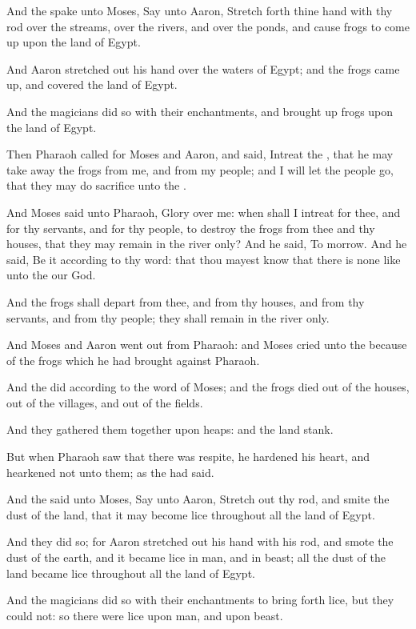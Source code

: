 \Verse And the \LORD spake unto Moses, Say unto Aaron, Stretch forth thine hand with thy rod over the streams, over the rivers, and over the ponds, and cause frogs to come up upon the land of Egypt.

\Verse And Aaron stretched out his hand over the waters of Egypt; and the frogs came up, and covered the land of Egypt.

\Verse And the magicians did so with their enchantments, and brought up frogs upon the land of Egypt.

\Verse Then Pharaoh called for Moses and Aaron, and said, Intreat the \LORD, that he may take away the frogs from me, and from my people; and I will let the people go, that they may do sacrifice unto the \LORD.

\Verse And Moses said unto Pharaoh, Glory over me: when shall I intreat for thee, and for thy servants, and for thy people, to destroy the frogs from thee and thy houses, that they may remain in the river only?  \Verse And he said, To morrow. And he said, Be it according to thy word: that thou mayest know that there is none like unto the \LORD our God.

\Verse And the frogs shall depart from thee, and from thy houses, and from thy servants, and from thy people; they shall remain in the river only.

\Verse And Moses and Aaron went out from Pharaoh: and Moses cried unto the \LORD because of the frogs which he had brought against Pharaoh.

\Verse And the \LORD did according to the word of Moses; and the frogs died out of the houses, out of the villages, and out of the fields.

\Verse And they gathered them together upon heaps: and the land stank.

\Verse But when Pharaoh saw that there was respite, he hardened his heart, and hearkened not unto them; as the \LORD had said.

\Verse And the \LORD said unto Moses, Say unto Aaron, Stretch out thy rod, and smite the dust of the land, that it may become lice throughout all the land of Egypt.

\Verse And they did so; for Aaron stretched out his hand with his rod, and smote the dust of the earth, and it became lice in man, and in beast; all the dust of the land became lice throughout all the land of Egypt.

\Verse And the magicians did so with their enchantments to bring forth lice, but they could not: so there were lice upon man, and upon beast.

